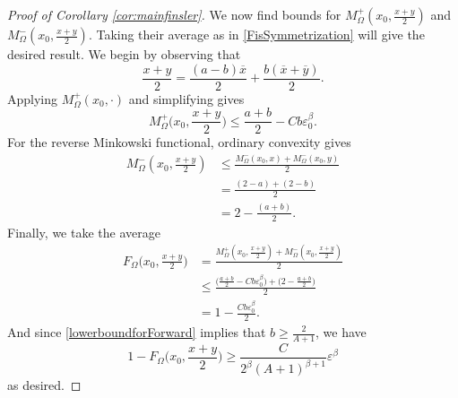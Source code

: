 \documentclass[10pt,a4paper]{amsart}
\begin{document}
\begin{proof}[Proof of Corollary \ref{cor:mainfinsler}]
We now find bounds for $M^+_\Omega(x_0,\frac{x+y}{2})$ and $M^-_\Omega(x_0,\frac{x+y}{2})$. Taking their average as in \ref{FisSymmetrization} will give the desired result. We begin by observing that
\begin{equation}
    \frac{x+y}{2}=\frac{(a-b)\overline{x}}{2} + \frac{b(\overline{x}+\overline{y})}{2}.
\end{equation}
Applying $M_\Omega^+(x_0,\cdot)$ and simplifying gives
\begin{equation}
 M^+_\Omega\bigg(x_0,\frac{x+y}{2}\bigg)  \leq \frac{a+b}{2} - Cb\varepsilon_0^\beta .
\end{equation}
For the reverse Minkowski functional, ordinary convexity gives
\begin{align}
    M^-_\Omega(x_0,\frac{x+y}{2}) &\leq \frac{M_\Omega^-(x_0,x) + M_\Omega^-(x_0,y)}{2}\\
    & = \frac{(2-a) + (2-b)}{2}\\
    & = 2 - \frac{(a+b)}{2}.
\end{align}
Finally, we take the average
\begin{align}
 F_\Omega\bigg(x_0,\frac{x+y}{2}\bigg) & = \frac{M^+_\Omega(x_0,\frac{x+y}{2}) + M^-_\Omega(x_0,\frac{x+y}{2})}{2} \\
 & \leq \frac{\big(\frac{a+b}{2} - Cb\varepsilon_0^\beta\big) + \big(2 - \frac{a+b}{2}\big)}{2} \\
 & = 1-\frac{Cb\varepsilon_0^\beta}{2}.
\end{align}
And since \ref{lowerboundforForward} implies that $b \geq \frac{2}{A+1}$, we have
\begin{equation}
    1-F_\Omega\bigg(x_0,\frac{x+y}{2}\bigg) \geq \frac{C}{2^\beta(A+1)^{\beta+1}}\varepsilon^\beta
\end{equation}
as desired.



\end{proof}
\end{document}
